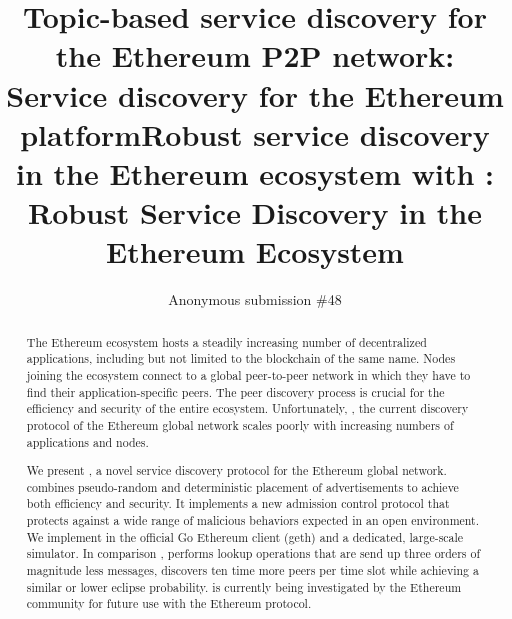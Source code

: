 \documentclass[compsoc, conference, a4paper, 10pt, times]{IEEEtran}
\begin{document}
\title{Topic-based service discovery for the Ethereum P2P network}
\title{\sysname: Service discovery for the Ethereum platform}
\title{Robust service discovery in the Ethereum ecosystem with \sysname}
\title{\sysname: Robust Service Discovery in the Ethereum Ecosystem}
\author{Anonymous submission \#48}
\maketitle
\begin{abstract}

The Ethereum ecosystem hosts a steadily increasing number of decentralized applications, including but not limited to the blockchain of the same name. Nodes joining the ecosystem connect to a global peer-to-peer network in which they have to find their application-specific peers. The peer discovery process is crucial for the efficiency and security of the entire ecosystem. Unfortunately, \discv, the current discovery protocol of the Ethereum global network scales poorly with increasing numbers of applications and nodes.

We present \sysname, a novel service discovery protocol for the Ethereum global network. \sysname combines pseudo-random and deterministic placement of advertisements to achieve both efficiency and security. It implements a new admission control protocol that protects against a wide range of malicious behaviors expected in an open environment. 
We implement \sysname in the official Go Ethereum client (geth) and a dedicated, large-scale simulator.
In comparison \discv, \sysname performs lookup operations that are send up three orders of magnitude less messages, discovers ten time more peers per time slot while achieving a similar or lower eclipse probability. \sysname is currently being investigated by the Ethereum community for future use with
the Ethereum protocol.

\end{abstract}





















%
\clearpage



\end{document}
